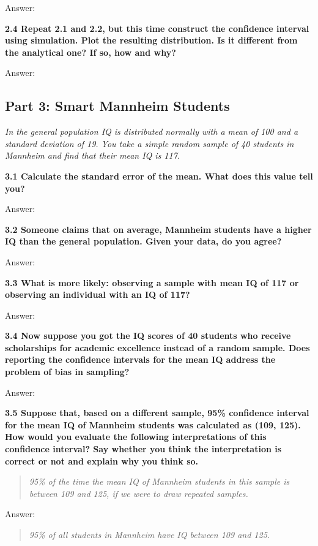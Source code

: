 \documentclass[
]{article}
\begin{document}
Answer:

\textbf{2.4 Repeat 2.1 and 2.2, but this time construct the confidence
interval using simulation. Plot the resulting distribution. Is it
different from the analytical one? If so, how and why?}

Answer:

\hypertarget{part-3-smart-mannheim-students}{%
\subsection{Part 3: Smart Mannheim
Students}\label{part-3-smart-mannheim-students}}

\emph{In the general population IQ is distributed normally with a mean
of 100 and a standard deviation of 19. You take a simple random sample
of 40 students in Mannheim and find that their mean IQ is 117.}

\textbf{3.1 Calculate the standard error of the mean. What does this
value tell you?}

Answer:

\textbf{3.2 Someone claims that on average, Mannheim students have a
higher IQ than the general population. Given your data, do you agree?}

Answer:

\textbf{3.3 What is more likely: observing a sample with mean IQ of 117
or observing an individual with an IQ of 117?}

Answer:

\textbf{3.4 Now suppose you got the IQ scores of 40 students who receive
scholarships for academic excellence instead of a random sample. Does
reporting the confidence intervals for the mean IQ address the problem
of bias in sampling?}

Answer:

\textbf{3.5 Suppose that, based on a different sample, 95\% confidence
interval for the mean IQ of Mannheim students was calculated as (109,
125). How would you evaluate the following interpretations of this
confidence interval? Say whether you think the interpretation is correct
or not and explain why you think so.}

\begin{quote}
\emph{95\% of the time the mean IQ of Mannheim students in this sample
is between 109 and 125, if we were to draw repeated samples.}
\end{quote}

Answer:

\begin{quote}
\emph{95\% of all students in Mannheim have IQ between 109 and 125.}
\end{quote}
\end{document}

